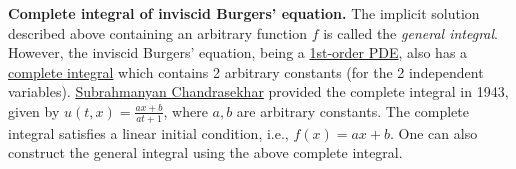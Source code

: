 \documentclass{article}
\begin{document}
{\bf Complete integral of inviscid Burgers' equation.} The implicit solution described above containing an arbitrary function $f$ is called the {\it general integral}. However, the inviscid Burgers' equation, being a \href{https://en.wikipedia.org/wiki/First-order_partial_differential_equation}{1st-order PDE}, also has a \href{https://en.wikipedia.org/wiki/First-order_partial_differential_equation#general_integral_and_complete_integral}{complete integral} which contains 2 arbitrary constants (for the 2 independent variables). \href{https://en.wikipedia.org/wiki/Subrahmanyan_Chandrasekhar}{\sc Subrahmanyan Chandrasekhar} provided the complete integral in 1943, given by $u(t,x) = \frac{ax + b}{at + 1}$, where $a,b$ are arbitrary constants. The complete integral satisfies a linear initial condition, i.e., $f(x) = ax + b$. One can also construct the general integral using the above complete integral.
\end{document}
